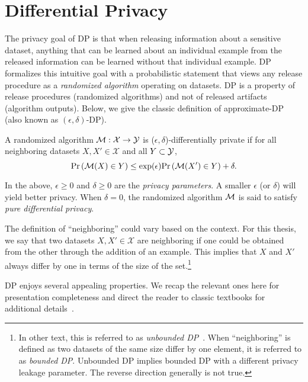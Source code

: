 \section{Differential Privacy}
The privacy goal of DP is that when releasing information about a sensitive dataset, anything that can be learned about an individual example from the released information can be learned without that individual example.
DP formalizes this intuitive goal with a probabilistic statement that views any release procedure as a \emph{randomized algorithm} operating on datasets.
DP is a property of release procedures (randomized algorithms) and not of released artifacts (algorithm outputs).
Below, we give the classic definition of approximate-DP (also known as $(\epsilon, \delta)$-DP).
\begin{defi}[Approximate-DP]
A randomized algorithm $\mathcal{M}: \mathcal{X} \to \mathcal{Y}$ is ($\epsilon, \delta$)-differentially private if for all neighboring datasets $X, X'\in\mathcal{X}$ and all $Y \subset \mathcal{Y}$, 
$$
\mathrm{Pr}\left(\mathcal{M}(X) \in Y\right) \le \exp( \epsilon ) \mathrm{Pr}\left( \mathcal{M}(X') \in Y \right) + \delta.
\label{eq:epsilon_delta_dp}
$$
\end{defi}
In the above, $\epsilon \ge 0$ and $\delta \ge 0$ are the \emph{privacy parameters}.
A smaller $\epsilon$ (or $\delta$) will yield better privacy.
When $\delta=0$, the randomized algorithm $\mathcal{M}$ is said to satisfy \emph{pure differential privacy}.

The definition of ``neighboring'' could vary based on the context. 
For this thesis, we say that two datasets $X, X' \in \mathcal{X}$ are neighboring if one could be obtained from the other through the addition of an example. 
This implies that $X$ and $X'$ always differ by one in terms of the size of the set.\footnote{
In other text, this is referred to as \emph{unbounded DP}~\cite{kifer2011no}. When ``neighboring'' is defined as two datasets of the same size differ by one element, it is referred to as \emph{bounded DP}.
Unbounded DP implies bounded DP with a different privacy leakage parameter.
The reverse direction generally is not true.
}

DP enjoys several appealing properties. 
We recap the relevant ones here for presentation completeness and direct the reader to classic textbooks for additional details~\cite{dwork2014algorithmic,vadhan2017complexity}.

